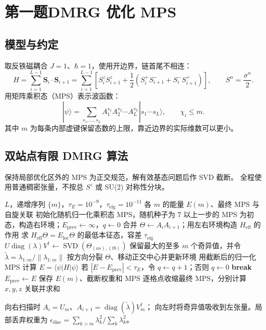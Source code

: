 \documentclass[UTF8,a4paper,zihao=5,fontset=fandol]{ctexart}
\begin{document}
\section*{第一题\quad DMRG 优化 MPS}

\subsection*{模型与约定}
取反铁磁耦合 $J=1$、$\hbar=1$，使用开边界，链首尾不相连：
\[
H=\sum_{i=1}^{L-1}\bm S_i\cdot\bm S_{i+1}
 =\sum_{i=1}^{L-1}
 \left[S_i^zS_{i+1}^z+
 \frac12\left(S_i^+S_{i+1}^-+S_i^-S_{i+1}^+\right)\right],
 \qquad S^\alpha=\frac{\sigma^\alpha}{2}.
\]
用矩阵乘积态（MPS）表示波函数：
\[
|\psi\rangle=
\sum_{s_1,\ldots,s_L} A_1^{s_1}A_2^{s_2}\cdots A_L^{s_L}
|s_1\cdots s_L\rangle,\qquad \chi_i\le m.
\]
其中 $m$ 为每条内部虚键保留态数的上限，靠近边界的实际维数可以更小。

\subsection*{双站点有限 DMRG 算法}
保持局部优化区外的 MPS 为正交规范，解有效基态问题后作 SVD 截断。
全程使用普通稠密张量，不按总 $S^z$ 或 SU(2) 对称性分块。
\begin{algorithm}[H]
\caption{双站点 DMRG 的伪代码}
\footnotesize
\begin{algorithmic}[1]
\Require $L$，递增序列 $\{m\}$，$\tau_E=10^{-9}$，$\tau_{\mathrm{eig}}=10^{-11}$
\Ensure 各 $m$ 的能量 $E(m)$、最终 MPS 与自旋关联
\State 初始化随机归一化乘积态 MPS，随机种子为 $7$
  \State 以上一步的 MPS 为初态，构造右环境；$E_{\mathrm{prev}}\gets\infty$，$q\gets0$
        \State 合并 $\Theta\gets A_iA_{i+1}$；用左右环境构造 $H_{\mathrm{eff}}$ 的作用
        \State 求 $H_{\mathrm{eff}}\Theta=E_{\mathrm{loc}}\Theta$ 的最低本征态，容差 $\tau_{\mathrm{eig}}$
        \State $U\operatorname{diag}(\lambda)V^\dagger\gets\operatorname{SVD}(\Theta_{(as),(tb)})$
        \State 保留最大的至多 $m$ 个奇异值，并令 $\widetilde\lambda=\lambda_{1:m}/\|\lambda_{1:m}\|$
        \State 按方向分裂 $\Theta$、移动正交中心并更新环境
      \EndFor
    \EndFor
    \State 用截断后的归一化 MPS 计算 $E=\langle\psi|H|\psi\rangle$
    \State 若 $|E-E_{\mathrm{prev}}|<\tau_E$，令 $q\gets q+1$；否则 $q\gets0$
     \State \textbf{break} \EndIf
    \State $E_{\mathrm{prev}}\gets E$
  \EndFor
  \State 保存 $E(m)$、截断权重和 MPS
\EndFor
\State 逐格点收缩最终 MPS，分别计算 $x,y,z$ 关联并求和
\end{algorithmic}
\end{algorithm}
向右扫描时 $A_i=U_m$、$A_{i+1}=\operatorname{diag}(\widetilde\lambda)V_m^\dagger$；
向左时将奇异值吸收到左张量。局部丢弃权重为
$\epsilon_{\mathrm{disc}}=\sum_{k>m}\lambda_k^2/\sum_k\lambda_k^2$。
\end{document}
